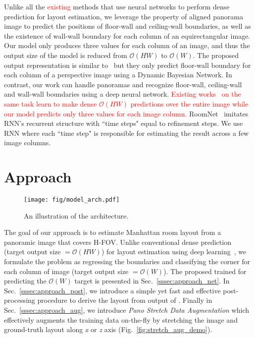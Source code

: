 \documentclass[10pt,twocolumn,letterpaper]{article}
\newcommand{\threesixty}{\text{360$^\circ$}\xspace}
\newcommand{\revise}[1]{\textcolor{red}{#1}}
\newcommand{\revise}[1]{#1}
\begin{document}
Unlike all the \revise{existing} methods that use neural networks to perform dense prediction for layout estimation, we leverage the property of aligned panorama image to predict the positions of floor-wall and ceiling-wall boundaries, as well as the existence of wall-wall boundary for each column of an equirectangular image.
Our model only produces three values for each column of an image, and thus the output size of the model is reduced from $\mathcal{O}(HW)$ to $\mathcal{O}(W)$.
The proposed output representation is similar to~\cite{delage2006dynamic} but they only predict floor-wall boundary for each column of a perspective image using a Dynamic Bayesian Network.
In contrast, our work can handle panoramas and recognize floor-wall, ceiling-wall and wall-wall boundaries using a deep neural network.  
\revise{Existing works~\cite{zou2018layoutnet,fernandez2018layouts,yang2018dula,fernandez2019CFL} on the same task learn to make dense $\mathcal{O}(HW)$ predictions over the entire image while our model predicts only three values for each image column.}
RoomNet~\cite{lee2017roomnet} imitates RNN's recurrent structure with ``time steps" equal to refinement steps. We use RNN where each ``time step" is responsible for estimating the result across a few image columns.
 
\section{Approach}

\begin{figure*}[h]
   \centering
   \setlength\tabcolsep{1pt}
\texttt{[image: fig/model\_arch.pdf]}
    \caption{An illustration of the \modelname architecture. }
    \label{fig:model_arch}
\end{figure*}

The goal of our approach is to estimate Manhattan room layout from a panoramic image that covers \threesixty H-FOV. Unlike conventional dense prediction (target output size $=\mathcal{O}(HW)$) for layout estimation using deep learning~\cite{dasgupta2016delay,fernandez2018layouts,fernandez2018panoroom,izadinia2017im2cad,mallya2015learning,ren2016coarse,zhao2017physics}, we formulate the problem as regressing the boundaries and classifying the corner for each column of image (target output size $=\mathcal{O}(W)$). The proposed \modelname trained for predicting the $\mathcal{O}(W)$ target is presented in Sec.~\ref{sssec:approach_net}. In Sec.~\ref{sssec:approach_post}, we introduce a simple yet fast and effective post-processing procedure to derive the layout from output of \modelname. Finally in Sec.~\ref{sssec:approach_aug}, we introduce \textit{Pano Stretch Data Augmentation} which effectively augments the training data on-the-fly by stretching the image and ground-truth layout along \textit{x} or \textit{z} axis (Fig.~\ref{fig:stretch_aug_demo}).
\end{document}
